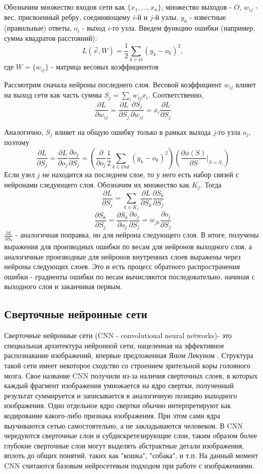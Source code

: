 		Обозначим множество входов сети как $\{x_1, \ldots, x_n\}$, множество выходов - $O$, $w_{ij}$ - вес, присвоенный ребру, соединяющему $i$-й и $j$-й узлы, $y_k$ - известные (правильные) ответы, $o_i$ - выход $i$-го узла. Введем функцию ошибки (например, сумма квадратов расстояний):
		$$ L(\vec{x}, W) = \frac{1}{2} \sum_{k \in O} (y_k - o_k)^2, $$
		где $W = \{w_{ij}\}$ - матрица весовых коэффициентов
		
		Рассмотрим сначала нейроны последнего слоя. Весовой коэффициент $w_{ij}$ влияет на выход сети как часть суммы $S_j = \sum_i w_{ij} x_i$. Соответственно,
		$$ \frac{\partial L}{\partial w_{ij}} = \frac{\partial L}{\partial S_j} \frac{\partial S_j}{\partial w_{ij}} = x_i \frac{\partial L}{\partial S_j} $$
		
		Аналогично, $S_j$ влияет на общую ошибку только в рамках выхода $j$-го узла $o_j$, поэтому
		$$ \frac{\partial L}{\partial S_j} = \frac{\partial L}{\partial o_j} \frac{\partial o_j}{\partial S_j}  = (\frac{\partial}{\partial o_j} \frac{1}{2} \sum_{k \in Out} (y_k - o_k)^2)(\frac{\partial \phi(S)}{\partial S} \bigg|_{S = S_j})$$
		Если узел $j$ не находится на последнем слое, то у него есть набор связей с нейронами следующего слоя. Обозначим их множество как $K_j$. Тогда
		$$ \frac{\partial L}{\partial S_j} = \sum_{k \in K_j} \frac{\partial L}{\partial S_k} \frac{\partial S_k}{\partial S_j} $$
		$$ \frac{\partial S_k}{\partial S_j} = \frac{\partial S_k}{\partial o_j} \frac{\partial o_j}{\partial S_j} = w_{jk}\frac{\partial o_j}{\partial S_j} $$
		$ \frac{\partial L}{\partial S_k}$ - аналогичная поправка, но для нейрона следующего слоя. В итоге, получены выражения для производных ошибки по весам для нейронов выходного слоя, а аналогичные производные для нейронов внутренних слоев выражены через нейроны следующих слоев. Это и есть процесс обратного распространения ошибки - градиенты ошибки по весам вычисляются последовательно, начиная с выходного слоя и заканчивая первым.
	\subsection{Сверточные нейронные сети}
		Сверточные нейронные сети (CNN - convolutional neural networks)- это специальная архитектура нейронной сети, нацеленная на эффективное распознавание изображений, впервые предложенная Яном Лекуном \cite{CNN-original}. Структура такой сети имеет некоторое сходство со строением зрительной коры головного мозга. Свое название CNN получили из-за наличия сверточных слоев, в которых каждый фрагмент изображения умножается на ядро свертки, полученный результат суммируется и записывается в аналогичную позицию выходного изображения. Одно отдельное ядро свертки обычно интерпретируют как кодирование какого-либо признака изображения. При этом сами ядра выучиваются сетью самостоятельно, а не закладываются человеком. В CNN чередуются сверточные слои и субдискретезирующие слои, таким образом более глубокие сверточные слои могут выделять абстрактные детали изображения, вплоть до общих понятий, таких как "кошка", "собака", и т.п. На данный момент CNN считаются базовым нейросетевым подходом при работе с изображениями.
